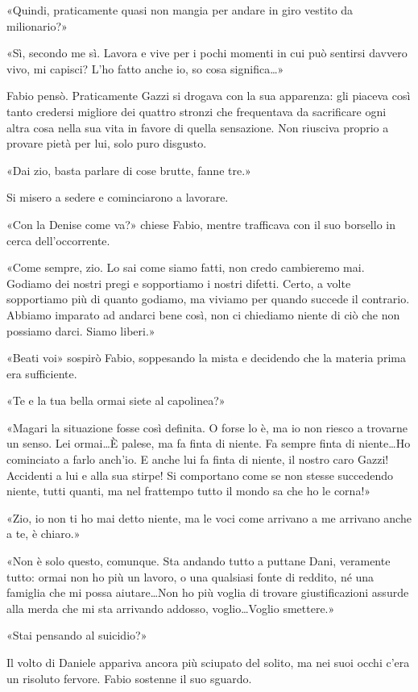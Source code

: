 «Quindi, praticamente quasi non mangia per andare in giro vestito da milionario?»

«Sì, secondo me sì. Lavora e vive per i pochi momenti in cui può sentirsi davvero vivo, mi capisci? L'ho fatto anche io, so cosa significa\ldots»

Fabio pensò. Praticamente Gazzi si drogava con la sua apparenza: gli piaceva così tanto credersi migliore dei quattro stronzi che frequentava da sacrificare ogni altra cosa nella sua vita in favore di quella sensazione. Non riusciva proprio a provare pietà per lui, solo puro disgusto.

«Dai zio, basta parlare di cose brutte, fanne tre.»

Si misero a sedere e cominciarono a lavorare.

«Con la Denise come va?» chiese Fabio, mentre trafficava con il suo borsello in cerca dell'occorrente.

«Come sempre, zio. Lo sai come siamo fatti, non credo cambieremo mai. Godiamo dei nostri pregi e sopportiamo i nostri difetti. Certo, a volte sopportiamo più di quanto godiamo, ma viviamo per quando succede il contrario. Abbiamo imparato ad andarci bene così, non ci chiediamo niente di ciò che non possiamo darci. Siamo liberi.»

«Beati voi» sospirò Fabio, soppesando la mista e decidendo che la materia prima era sufficiente.

«Te e la tua bella ormai siete al capolinea?»

«Magari la situazione fosse così definita. O forse lo è, ma io non riesco a trovarne un senso. Lei ormai\ldots È palese, ma fa finta di niente. Fa sempre finta di niente\ldots Ho cominciato a farlo anch'io. E anche lui fa finta di niente, il nostro caro Gazzi! Accidenti a lui e alla sua stirpe! Si comportano come se non stesse succedendo niente, tutti quanti, ma nel frattempo tutto il mondo sa che ho le corna!»

«Zio, io non ti ho mai detto niente, ma le voci come arrivano a me arrivano anche a te, è chiaro.»

«Non è solo questo, comunque. Sta andando tutto a puttane Dani, veramente tutto: ormai non ho più un lavoro, o una qualsiasi fonte di reddito, né una famiglia che mi possa aiutare\ldots Non ho più voglia di trovare giustificazioni assurde alla merda che mi sta arrivando addosso, voglio\ldots Voglio smettere.»

«Stai pensando al suicidio?»

Il volto di Daniele appariva ancora più sciupato del solito, ma nei suoi occhi c'era un risoluto fervore. Fabio sostenne il suo sguardo.

